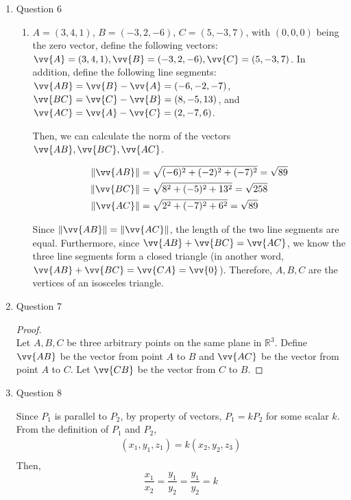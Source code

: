 \documentclass[11pt]{article}
\def\R {{\mathbb R}}
\newcommand{\norm}[1]{\lVert #1 \rVert}
\begin{document}
\begin{enumerate}
    \item Question 6
    \begin{enumerate}
        \item $A= (3,4,1),\,B=  (-3,2,-6),\, C=(5,-3,7)$, with $(0,0,0)$ being the zero vector, define the following vectors: $\vv{A}=(3,4,1), \vv{B}=(-3,2,-6), \vv{C}=(5,-3,7)$. In addition, define the following line segments: $\vv{AB}=\vv{B}-\vv{A}= (-6,-2,-7)$, $\vv{BC}=\vv{C}-\vv{B}=(8,-5,13)$, and $\vv{AC}=\vv{A}-\vv{C}=(2,-7,6)$.
        
        Then, we can calculate the norm of the vectors $\vv{AB},\vv{BC},\vv{AC}$.
        
        \begin{align*}
            \norm{\vv{AB}} &= \sqrt{(-6)^2+(-2)^2+(-7)^2} = \sqrt{89} \\
            \norm{\vv{BC}} &= \sqrt{8^2+(-5)^2+13^2} = \sqrt{258} \\
            \norm{\vv{AC}} &= \sqrt{2^2+(-7)^2+6^2} = \sqrt{89}
        \end{align*}
        
        Since $\norm{\vv{AB}}=\norm{\vv{AC}}$, the length of the two line segments are equal. Furthermore, since $\vv{AB}+\vv{BC}=\vv{AC}$, we know the three line segments form a closed triangle (in another word, $\vv{AB}+\vv{BC}=\vv{CA} = \vv{0}$). Therefore, $A,B,C$ are the vertices of an isosceles triangle.
    \end{enumerate}
    
    \item Question 7
    
    \begin{proof}
        \hfill \\
        Let $A,B,C$ be three arbitrary points on the same plane in $\R^3$. Define $\vv {AB}$ be the vector from point $A$ to $B$ and $\vv {AC}$ be the vector from point $A$ to $C$. Let $\vv{CB}$ be the vector from $C$ to $B$.
    \end{proof}
    
    \item Question 8
    
    Since $P_1$ is parallel to $P_2$, by property of vectors, $P_1 = kP_2$ for some scalar $k$. From the definition of $P_1$ and $P_2$,
    \begin{align*}
        (x_1,y_1,z_1) = k(x_2,y_2,z_3) \\
    \end{align*}
    Then,
    $$
    \frac{x_1}{x_2} = \frac{y_1}{y_2} = \frac{y_1}{y_2} = k
    $$
    

\end{enumerate}
\end{document}
